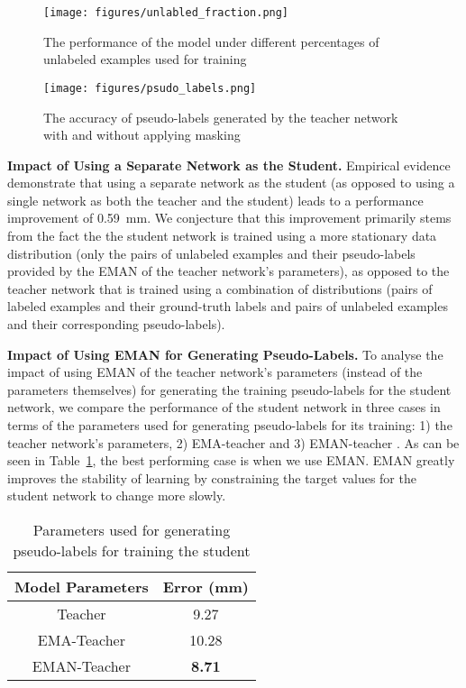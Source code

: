 \documentclass{article}
\begin{document}
\begin{figure}[t]
\centering
\texttt{[image: figures/unlabled\_fraction.png]}
\caption{The performance of the model under different percentages of unlabeled examples used for training}
\label{fig:semispu}
\end{figure}


\begin{figure}[t]
\centering
\texttt{[image: figures/psudo\_labels.png]}
\caption{The accuracy of pseudo-labels generated by the teacher network with and without applying masking}
\label{fig:plabels}
\end{figure}


\textbf{Impact of Using a Separate Network as the Student.} Empirical evidence demonstrate that using a separate network as the student (as opposed to using a single network as both the teacher and the student) leads to a performance improvement of 0.59~mm. We conjecture that this improvement primarily stems from the fact the the student network is trained using a more stationary data distribution (only the pairs of unlabeled examples and their pseudo-labels provided by the EMAN of the teacher network's parameters), as opposed to the teacher network that is trained using a combination of distributions (pairs of labeled examples and their ground-truth labels and pairs of unlabeled examples and their corresponding pseudo-labels).
\par


\textbf{Impact of Using EMAN for Generating Pseudo-Labels.} To analyse the impact of using EMAN of the teacher network's parameters (instead of the parameters themselves) for generating the training pseudo-labels for the student network, we compare the performance of the student network in three cases in terms of the parameters used for generating pseudo-labels for its training: 1) the teacher network's parameters, 2) EMA-teacher \cite{tarvainen2017mean} and 3) EMAN-teacher \cite{cai2021exponential}. As can be seen in Table~\ref{tab:params}, the best performing case is when we use EMAN. EMAN greatly improves the stability of learning by constraining the target values for the student network to change more slowly.

\begin{table}[t]
\caption{Parameters used for generating pseudo-labels for training the student}
\setlength{\tabcolsep}{4pt}
\centering
\begin{tabular}{cc}
            \hline
            Model Parameters  &   Error (mm)  \\
            \hline
                Teacher                  &         9.27 \\
                EMA-Teacher              &         10.28 \\
                EMAN-Teacher              &         \textbf{8.71} \\
        
            \hline
        \end{tabular}
        \label{tab:params}
\end{table}
\end{document}
